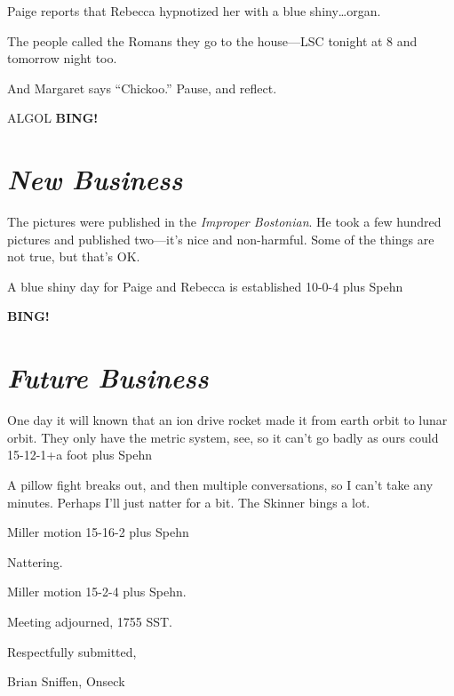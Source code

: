 \documentclass[10pt]{article}
\newcommand{\bing}{{\bf BING!} }
\newcommand{\goto}[1]{\bing \vskip 12pt \section*{{\em{#1}}}}
\newcommand{\ps}{ plus Spehn\xspace}
\begin{document}
Paige reports that Rebecca hypnotized her with a blue shiny\dots organ.

The people called the Romans they go to the house---LSC tonight at 8
and tomorrow night too.

And Margaret says ``Chickoo.''  Pause, and reflect.

ALGOL
\goto{New Business}
The pictures were published in the \emph{Improper Bostonian}.  He took
a few hundred pictures and published two---it's nice and non-harmful.
Some of the things are not true, but that's OK.

A blue shiny day for Paige and Rebecca is established 10-0-4\ps

\goto{Future Business}

One day it will known that an ion drive rocket made it from earth
orbit to lunar orbit.  They only have the metric system, see, so it
can't go badly as ours could 15-12-1+a foot\ps

A pillow fight breaks out, and then multiple conversations, so I can't
take any minutes.  Perhaps I'll just natter for a bit.  The Skinner
bings a lot.

Miller motion 15-16-2\ps

Nattering.

Miller motion 15-2-4\ps.

\vspace{12pt}

\noindent
Meeting adjourned, 1755 SST.

\vspace{18pt}

\centerline{Respectfully submitted,}
\centerline{Brian Sniffen, Onseck}
\end{document}
